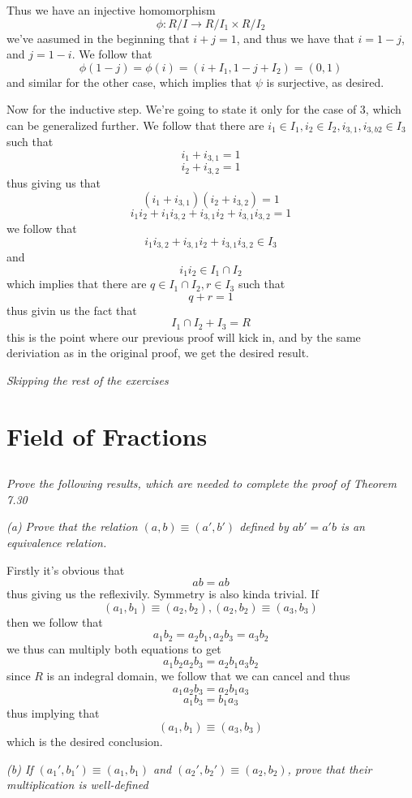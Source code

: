 \documentclass[11pt,oneside,titlepage]{book}
\begin{document}
Thus we have an injective homomorphism
$$\phi: R/I \to R/I_1 \times R/I_2$$
we've aasumed in the beginning that $i + j = 1$, and thus we have that
$i = 1 - j$, and $j = 1 - i$. We follow that
$$\phi(1 - j) = \phi(i) = (i + I_1, 1 - j + I_2) = (0, 1)$$
and similar for the other case, which implies that $\psi$ is
surjective, as desired.

Now for the inductive step. We're going to state it only for the
case of 3, which can be generalized further. We follow that there are
$i_1 \in I_1, i_2 \in I_2, i_{3, 1}, i_{3, b2} \in I_3$ such that
$$i_1 + i_{3, 1} = 1$$
$$i_2 + i_{3, 2} = 1$$
thus giving us that
$$(i_1 + i_{3, 1})(i_2 + i_{3, 2}) = 1$$
$$i_1 i_2 + i_1 i_{3, 2} + i_{3, 1} i_2 + i_{3, 1} i_{3, 2} = 1$$
we follow that
$$i_1 i_{3, 2} + i_{3, 1} i_2 + i_{3, 1} i_{3, 2} \in I_3$$
and
$$i_1 i_2 \in I_1 \cap I_2$$
which implies that there are $q \in I_1 \cap I_2, r \in I_3$ such that 
$$q + r = 1$$
thus givin us the fact that
$$I_1 \cap I_2 + I_3 = R$$
this is the point where our previous proof will kick in, and by the same
deriviation as in the original proof, we get the desired result.

\textit{Skipping the rest of the exercises}

\section{Field of Fractions}

\subsection{}

\textit{Prove the following results, which are needed to complete the
  proof of Theorem 7.30}

\textit{(a) Prove that the relation $(a, b) \equiv (a', b')$ defined
  by $ab' = a'b$ is an equivalence relation.}

Firstly it's obvious that
$$ab = ab$$
thus giving us the reflexivily. Symmetry is also kinda trivial.  If
$$(a_1, b_1) \equiv (a_2, b_2), (a_2, b_2) \equiv (a_3, b_3)$$
then we follow that
$$a_1 b_2 = a_2 b_1, a_2 b_3 = a_3 b_2$$
we thus can multiply both equations to get 
$$a_1 b_2 a_2 b_3 = a_2 b_1 a_3 b_2$$
since $R$ is an indegral domain, we follow that we can cancel and thus
$$a_1 a_2 b_3 = a_2 b_1 a_3$$
$$a_1  b_3 =  b_1 a_3$$
thus implying that
$$(a_1, b_1) \equiv (a_3, b_3)$$
which is the desired conclusion.

\textit{(b) If $(a_1', b_1') \equiv (a_1, b_1)$ and $(a_2', b_2')
  \equiv (a_2, b_2)$, prove that their multiplication is well-defined
}
\end{document}
